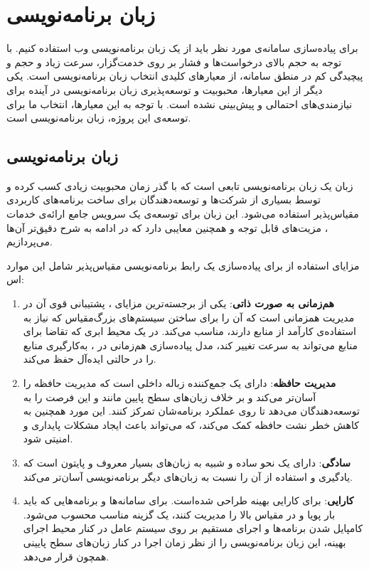 \section{زبان برنامه‌نویسی}
برای پیاده‌سازی سامانه‌ی مورد نظر باید از یک زبان برنامه‌نویسی وب استفاده کنیم. با توجه به حجم بالای درخواست‌ها و فشار بر روی خدمت‌گزار، سرعت زیاد و حجم و پیچیدگی کم در منطق سامانه، از معیار‌های کلیدی انتخاب زبان برنامه‌نویسی است. یکی دیگر از این معیارها، محبوبیت و توسعه‌پذیری زبان برنامه‌نویسی در آینده برای نیازمندی‌های احتمالی و پیش‌بینی نشده است. با توجه به این معیارها، انتخاب ما برای توسعه‌ی این پروژه، زبان برنامه‌نویسی  است.

\subsection{زبان برنامه‌نویسی }
زبان  یک زبان برنامه‌نویسی تابعی است که با گذر زمان محبوبیت زیادی کسب کرده و توسط بسیاری از شرکت‌ها و توسعه‌دهندگان برای ساخت برنامه‌های کاربردی مقیاس‌پذیر استفاده می‌شود. این زبان برای توسعه‌ی ‌یک سرویس جامع ارائه‌ی خدمات ، مزیت‌های قابل توجه و همچنین معایبی دارد که در ادامه به شرح دقیق‌تر آن‌ها می‌پردازیم.

\clearpage

مزایای استفاده از  برای پیاده‌سازی یک رابط برنامه‌نویسی مقیاس‌پذیر شامل این موارد اس\cite{Lockard2019}:
\begin{enumerate}

\item  \textbf{هم‌زمانی به صورت ذاتی}: یکی از برجسته‌ترین مزایای ، پشتیبانی قوی آن در مدیریت همزمانی است که آن را برای ساختن سیستم‌های بزرگ‌مقیاس که نیاز به استفاده‌ی کارآمد از منابع دارند، مناسب می‌کند. در یک محیط ابری که تقاضا برای منابع می‌تواند به سرعت تغییر کند، مدل پیاده‌سازی هم‌زمانی در ، به‌کارگیری منابع را در حالتی ایده‌آل حفظ می‌کند.


\item  \textbf{مدیریت حافظه}:  دارای یک جمع‌کننده زباله داخلی است که مدیریت حافظه را آسان‌تر می‌کند و بر خلاف زبان‌های سطح پایین مانند  و  این فرصت را به توسعه‌دهندگان می‌دهد تا روی عملکرد برنامه‌شان تمرکز کنند. این مورد همچنین به کاهش خطر نشت حافظه کمک می‌کند، که می‌تواند باعث ایجاد مشکلات پایداری و امنیتی شود.

\item \textbf{سادگی}:  دارای یک نحو ساده و شبیه به زبان‌های بسیار معروف و پایتون است که یادگیری و استفاده از آن را نسبت به زبان‌های دیگر برنامه‌نویسی آسان‌تر می‌کند.

\item \textbf{کارایی}:  برای کارایی بهینه طراحی شده‌است. برای سامانه‌ها و برنامه‌هایی که باید بار پویا و در مقیاس بالا را مدیریت کنند، یک گزینه مناسب محسوب می‌شود. کامپایل شدن برنامه‌ها و اجرای مستقیم بر روی سیستم عامل در کنار  محیط اجرای بهینه، این زبان برنامه‌نویسی را از نظر زمان اجرا در کنار زبان‌های سطح پایینی همچون  قرار می‌دهد.\cite{Donovan2015}
\end{enumerate}

